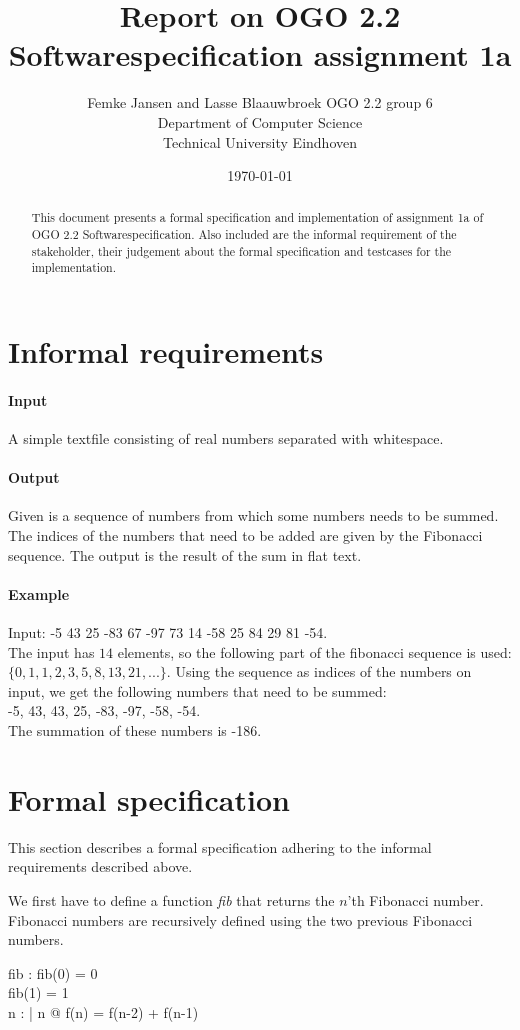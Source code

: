 \documentclass[12pt]{article}
\title{Report on OGO 2.2 Softwarespecification assignment 1a}
\author{
        Femke Jansen and Lasse Blaauwbroek OGO 2.2 group 6 \\
                Department of Computer Science\\
        Technical University Eindhoven\\
}
\date{\today}
\begin{document}
\maketitle

\begin{abstract}
This document presents a formal specification and implementation of assignment 1a of OGO 2.2 Softwarespecification. Also included are the informal requirement of the stakeholder, their judgement about the formal specification and testcases for the implementation.
\end{abstract}

\section{Informal requirements}
\paragraph{Input} A simple textfile consisting of real numbers separated with whitespace.
\paragraph{Output} Given is a sequence of numbers from which some numbers needs to be summed. The indices of the numbers that need to be added are given by the Fibonacci sequence. The output is the result of the sum in flat text.
\paragraph{Example}
Input: -5 43 25 -83  67 -97  73  14  -58 25  84   29 81  -54.\\
The input has $14$ elements, so the following part of the fibonacci sequence is used: $\{0, 1, 1, 2, 3, 5, 8, 13, 21, ...\}$. Using the sequence as indices of the numbers on input, we get the following numbers that need to be summed: \\ -5, 43, 43, 25, -83, -97, -58, -54. \\ The summation of these numbers is -186.

\section{Formal specification}

This section describes a formal specification adhering to the informal requirements described above.

We first have to define a function  \textit{fib} that returns the $n$'th Fibonacci number. Fibonacci numbers are recursively defined using the two previous Fibonacci numbers.
\begin{axdef}
fib : \nat \fun \nat
\where
fib(0) = 0 \\
fib(1) = 1 \\
\forall n : \nat | n  @ f(n) = f(n-2) + f(n-1)
\end{axdef}
\end{document}
